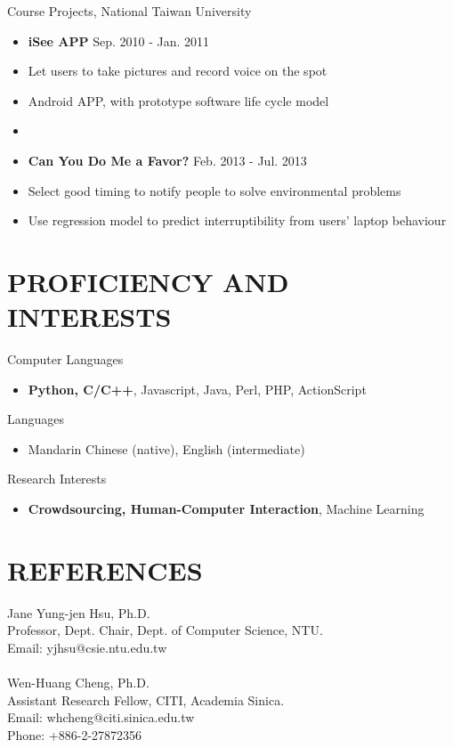\documentclass[margin]{main}
\begin{document}
\begin{resume}
Course Projects, National Taiwan University
\begin{itemize} \itemsep -2pt
    \item[] {\bf iSee APP} \hfill Sep. 2010 - Jan. 2011
    \item[] Let users to take pictures and record voice on the spot
    \item[] Android APP, with prototype software life cycle model
    \item[]
    \item[] {\bf Can You Do Me a Favor?} \hfill Feb. 2013 - Jul. 2013
    \item[] Select good timing to notify people to solve environmental problems
    \item[] Use regression model to predict interruptibility from users' laptop behaviour
\end{itemize}

\section{PROFICIENCY AND INTERESTS}
Computer Languages
\begin{itemize} \itemsep -2pt
    \item[] {\bf Python, C/C++}, Javascript, Java, Perl, PHP, ActionScript
\end{itemize}

Languages
\begin{itemize} \itemsep -2pt
    \item[] Mandarin Chinese (native), English (intermediate)
\end{itemize}

Research Interests
\begin{itemize} \itemsep -2pt
    \item[] {\bf Crowdsourcing, Human-Computer Interaction}, Machine Learning
\end{itemize}

\section{REFERENCES}
Jane Yung-jen Hsu, Ph.D. \\
Professor, Dept. Chair, Dept. of Computer Science, NTU. \\
Email: yjhsu@csie.ntu.edu.tw \\
\\
Wen-Huang Cheng, Ph.D. \\
Assistant Research Fellow, CITI, Academia Sinica. \\
Email: whcheng@citi.sinica.edu.tw \\
Phone: +886-2-27872356 \\

\end{resume}
\end{document}
